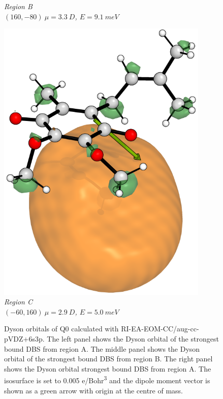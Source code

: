 \begin{figure}[h]
\begin{minipage}[b]{0.30\textwidth}
      \small\emph{Region B \\$(160,-80)~\mu=3.3~D$, $E=9.1~meV$}
  \end{minipage}
  \hfill
  \begin{minipage}[b]{0.30\textwidth}
    \centering
    \includegraphics[width=0.9\textwidth]{chapters/results/image/Q1_112.png}
    \small\emph{Region C \\$(-60,160)~\mu=2.9~D$, $E=5.0~meV$}
  \end{minipage}
  \caption[Dyson orbitals of Q1]{Dyson orbitals of Q0 calculated with RI-EA-EOM-CC/aug-cc-pVDZ+6s3p. The left panel shows the Dyson orbital of the strongest bound DBS from region A. The middle panel shows the Dyson orbital of the strongest bound DBS from region B. The right panel shows the Dyson orbital strongest bound DBS from region A. The isosurface is set to 0.005 e/Bohr\textsuperscript{3} and the dipole moment vector is shown as a green arrow with origin at the centre of mass.}
  \label{fig:Q1_dyson}
\end{figure}

